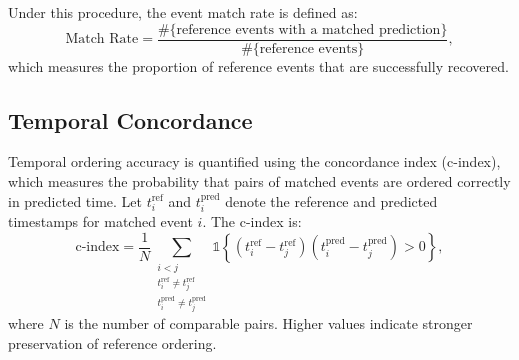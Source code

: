 \documentclass[pdflatex,sn-mathphys-num]{sn-jnl}%
\theoremstyle{thmstyleone}%
\theoremstyle{thmstyletwo}%
\theoremstyle{thmstylethree}%
\begin{document}
Under this procedure, the event match rate is defined as:
\[
\text{Match Rate} =
\frac{\#\{\text{reference events with a matched prediction}\}}
     {\#\{\text{reference events}\}},
\]
which measures the proportion of reference events that are successfully recovered.






\subsection{Temporal Concordance}
\label{apd:temporal-concordance}

Temporal ordering accuracy is quantified using the concordance index (c-index), which
measures the probability that pairs of matched events are ordered correctly in predicted time.
Let $t^{\text{ref}}_i$ and $t^{\text{pred}}_i$ denote the reference and predicted timestamps for
matched event $i$. The c-index is:
\[
\text{c-index} = \frac{1}{N}
\sum_{\substack{i<j\\
t^{\text{ref}}_i \neq t^{\text{ref}}_j\\
t^{\text{pred}}_i \neq t^{\text{pred}}_j}}
\mathds{1}\!\left\{
(t^{\text{ref}}_i - t^{\text{ref}}_j)(t^{\text{pred}}_i - t^{\text{pred}}_j) > 0
\right\},
\]
where $N$ is the number of comparable pairs.  
Higher values indicate stronger preservation of reference ordering.
\end{document}
